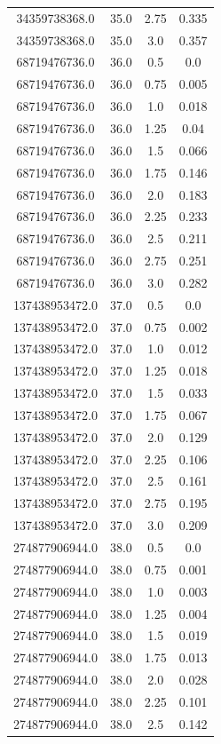 \begin{tabular}{|c|c|c|c|}
34359738368.0 & 35.0 & 2.75 & 0.335 \\ 
34359738368.0 & 35.0 & 3.0 & 0.357 \\ 
68719476736.0 & 36.0 & 0.5 & 0.0 \\ 
68719476736.0 & 36.0 & 0.75 & 0.005 \\ 
68719476736.0 & 36.0 & 1.0 & 0.018 \\ 
68719476736.0 & 36.0 & 1.25 & 0.04 \\ 
68719476736.0 & 36.0 & 1.5 & 0.066 \\ 
68719476736.0 & 36.0 & 1.75 & 0.146 \\ 
68719476736.0 & 36.0 & 2.0 & 0.183 \\ 
68719476736.0 & 36.0 & 2.25 & 0.233 \\ 
68719476736.0 & 36.0 & 2.5 & 0.211 \\ 
68719476736.0 & 36.0 & 2.75 & 0.251 \\ 
68719476736.0 & 36.0 & 3.0 & 0.282 \\ 
137438953472.0 & 37.0 & 0.5 & 0.0 \\ 
137438953472.0 & 37.0 & 0.75 & 0.002 \\ 
137438953472.0 & 37.0 & 1.0 & 0.012 \\ 
137438953472.0 & 37.0 & 1.25 & 0.018 \\ 
137438953472.0 & 37.0 & 1.5 & 0.033 \\ 
137438953472.0 & 37.0 & 1.75 & 0.067 \\ 
137438953472.0 & 37.0 & 2.0 & 0.129 \\ 
137438953472.0 & 37.0 & 2.25 & 0.106 \\ 
137438953472.0 & 37.0 & 2.5 & 0.161 \\ 
137438953472.0 & 37.0 & 2.75 & 0.195 \\ 
137438953472.0 & 37.0 & 3.0 & 0.209 \\ 
274877906944.0 & 38.0 & 0.5 & 0.0 \\ 
274877906944.0 & 38.0 & 0.75 & 0.001 \\ 
274877906944.0 & 38.0 & 1.0 & 0.003 \\ 
274877906944.0 & 38.0 & 1.25 & 0.004 \\ 
274877906944.0 & 38.0 & 1.5 & 0.019 \\ 
274877906944.0 & 38.0 & 1.75 & 0.013 \\ 
274877906944.0 & 38.0 & 2.0 & 0.028 \\ 
274877906944.0 & 38.0 & 2.25 & 0.101 \\ 
274877906944.0 & 38.0 & 2.5 & 0.142 \\ 

\end{tabular}
